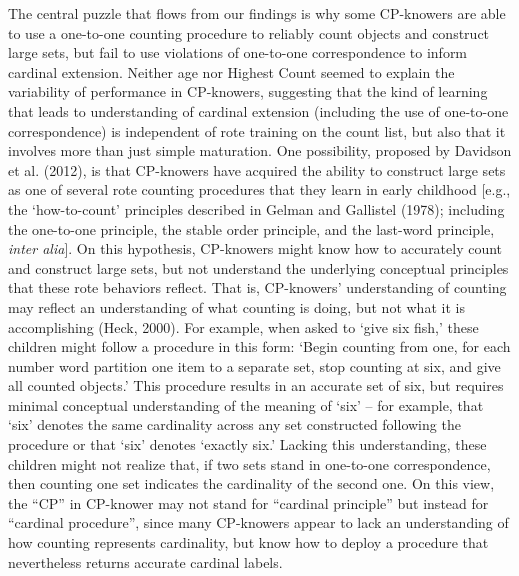 \documentclass[
  man,floatsintext]{apa7}
\begin{document}
The central puzzle that flows from our findings is why some CP-knowers are able to use a one-to-one counting procedure to reliably count objects and construct large sets, but fail to use violations of one-to-one correspondence to inform cardinal extension. Neither age nor Highest Count seemed to explain the variability of performance in CP-knowers, suggesting that the kind of learning that leads to understanding of cardinal extension (including the use of one-to-one correspondence) is independent of rote training on the count list, but also that it involves more than just simple maturation. One possibility, proposed by Davidson et al. (2012), is that CP-knowers have acquired the ability to construct large sets as one of several rote counting procedures that they learn in early childhood {[}e.g., the `how-to-count' principles described in Gelman and Gallistel (1978); including the one-to-one principle, the stable order principle, and the last-word principle, \emph{inter alia}{]}. On this hypothesis, CP-knowers might know how to accurately count and construct large sets, but not understand the underlying conceptual principles that these rote behaviors reflect. That is, CP-knowers' understanding of counting may reflect an understanding of what counting is doing, but not what it is accomplishing (Heck, 2000). For example, when asked to `give six fish,' these children might follow a procedure in this form: `Begin counting from one, for each number word partition one item to a separate set, stop counting at six, and give all counted objects.' This procedure results in an accurate set of six, but requires minimal conceptual understanding of the meaning of `six' -- for example, that `six' denotes the same cardinality across any set constructed following the procedure or that `six' denotes `exactly six.' Lacking this understanding, these children might not realize that, if two sets stand in one-to-one correspondence, then counting one set indicates the cardinality of the second one. On this view, the ``CP'' in CP-knower may not stand for ``cardinal principle'' but instead for ``cardinal procedure'', since many CP-knowers appear to lack an understanding of how counting represents cardinality, but know how to deploy a procedure that nevertheless returns accurate cardinal labels.
\end{document}
